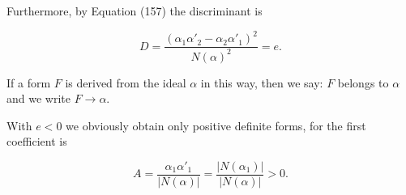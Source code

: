 Furthermore, by Equation (157) the discriminant is

$$D = \frac{(\alpha_1 \alpha'_2 - \alpha_2 \alpha'_1)^2}{N(\alpha)^2} = e.$$

If a form $F$ is derived from the ideal $\alpha$ in this way, then we say: $F$ belongs to $\alpha$ and we write $F \rightarrow \alpha$.

With $e < 0$ we obviously obtain only positive definite forms, for the first coefficient is

$$A = \frac{\alpha_1 \alpha'_1}{|N(\alpha)|} = \frac{|N(\alpha_1)|}{|N(\alpha)|} > 0.$$
